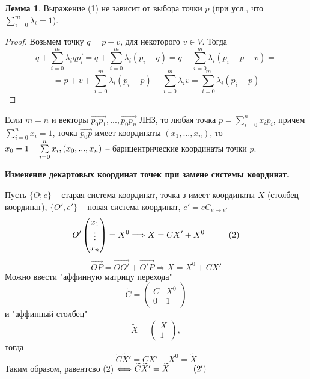 \documentclass[a4paper, 12pt]{article}
\newcommand\tab[1][.5cm]{\hspace*{#1}}
\theoremstyle{definition}
\newtheorem*{lemma}{Лемма}
\begin{document}
    \begin{lemma}
        Выражение (1) не зависит от выбора точки $p$ (при 
        усл., что $\sum\limits_{i=0}^{m} \lambda_i = 1$). 
    \end{lemma}
    \begin{proof}
        Возьмем точку $q = p + v$, для некоторого $v \in V$.
        Тогда $$q + \sum\limits_{i=0}^{m} 
        \lambda_i\overrightarrow{qp_i} = q + \sum\limits_{i=0}^
        {m} \lambda_i(p_i - q) = q + \sum\limits_{i=0}^{m} 
        \lambda_i(p_i - p - v) =$$ $$=p + v + \sum\limits_{i=0}^{m} 
        \lambda_i(p_i - p) - \sum\limits_{i=0}^{m} \lambda_i v
        = \sum\limits_{i=0}^{m} \lambda_i(p_i - p)$$

    \end{proof}
    Если $m = n$ и векторы $\overrightarrow{p_0p_1},...,
    \overrightarrow{p_0p_n}$ ЛНЗ, то любая точка $p = 
    \sum\limits_{i=0}^{n} x_ip_i$, причем $\sum\limits_{i=0}^
    {n} x_i = 1$, точка $\overrightarrow{p_0p}$ имеет 
    координаты $(x_1,...,x_n)$, то $x_0 = 1 - \sum\limits_{i=0}^
    {n} x_i,\\ (x_0,...,x_n)$ -- барицентрические координаты
    точки $p$. 
    \begin{center}
        \textbf{Изменение декартовых координат точек при 
        замене системы координат.} 
    \end{center}
    Пусть $\{O;e\}$ -- старая система координат, точка з имеет 
    координаты $X$ (столбец координат), $\{O', e'\}$ -- новая
    система координат, $e' = eC_{e \to e'}$
    $$O'\begin{pmatrix}
        x_1\\\vdots\\x_n
    \end{pmatrix} = X^0 \Longrightarrow X = CX' + X^0\tab[1cm]
    (2)$$
    $$\overrightarrow{OP} = \overrightarrow{OO'} + 
    \overrightarrow{O'P} \Longrightarrow X = X^0 + CX'$$    
    Можно ввести "аффинную матрицу перехода" 
    $$\widetilde{C} = \begin{pmatrix}
        C & X^0\\0& 1
    \end{pmatrix}$$
    и "аффинный столбец" $$\widetilde{X} = \begin{pmatrix}
        X\\1
    \end{pmatrix},$$ тогда $$\widetilde{C}\widetilde{X}' = 
    CX' + X^0 = \widetilde{X}$$
    Таким образом, равентсво (2) $\Longleftrightarrow \widetilde
    {C}\widetilde{X}' = \widetilde{X}\tab[1cm](2')$
\end{document}
